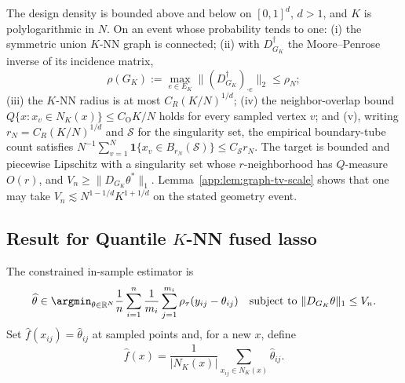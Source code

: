 \documentclass[twoside,11pt]{article}
\newenvironment{revision}{\color{revisionred}}{}
\begin{document}
\begin{assumption}\label{ass_knn}
\begin{revision}
The design density is bounded above and below on $[0,1]^d$, $d>1$, and $K$ is polylogarithmic in $N$. On an event whose probability tends to one: (i) the symmetric union $K$-NN graph is connected; (ii) with $D_{G_K}^{\dagger}$ the Moore--Penrose inverse of its incidence matrix,
\[
 \rho(G_K):=\max_{e\in E_K}\|(D_{G_K}^{\dagger})_{\cdot e}\|_2\le\rho_N;
\]
(iii) the $K$-NN radius is at most $C_R(K/N)^{1/d}$; (iv) the neighbor-overlap bound
$Q\{x:x_v\in N_K(x)\}\le C_{\mathrm O}K/N$ holds for every sampled vertex $v$; and (v), writing $r_N=C_R(K/N)^{1/d}$ and $\mathcal S$ for the singularity set, the empirical boundary-tube count satisfies $N^{-1}\sum_{v=1}^N\mathbf 1\{x_v\in B_{r_N}(\mathcal S)\}\le C_{\mathcal S}r_N$. The target is bounded and piecewise Lipschitz with a singularity set whose $r$-neighborhood has $Q$-measure $O(r)$, and $V_n\ge\|D_{G_K}\theta^*\|_1$. Lemma~\ref{app:lem:graph-tv-scale} shows that one may take $V_n\lesssim N^{1-1/d}K^{1+1/d}$ on the stated geometry event.
\end{revision}
\end{assumption}

\subsection{Result for Quantile \( K \)-NN fused lasso}
\begin{revision}
The constrained in-sample estimator is
\begin{equation}
 \widehat\theta\in\argmin_{\theta\in\mathbb R^N}
 \frac1n\sum_{i=1}^n\frac1{m_i}\sum_{j=1}^{m_i}
 \rho_\tau(y_{ij}-\theta_{ij})
 \quad\text{subject to }\|D_{G_K}\theta\|_1\le V_n.          \label{np_knn1}
\end{equation}
Set $\widehat f(x_{ij})=\widehat\theta_{ij}$ at sampled points and, for a new $x$, define
\begin{equation}
 \widehat f(x)=\frac1{|N_K(x)|}\sum_{x_{ij}\in N_K(x)}\widehat\theta_{ij}. \label{np_knn2}
\end{equation}
\end{revision}
\end{document}
